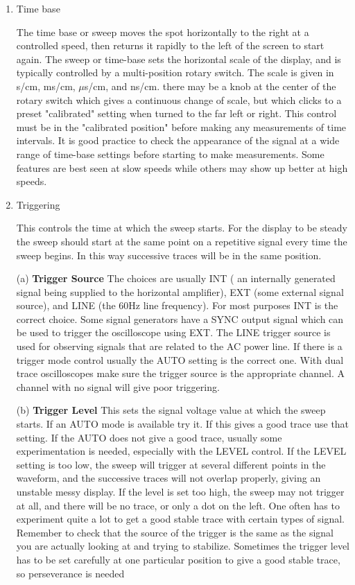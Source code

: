 \begin{enumerate}
\item Time base

The time base or sweep moves the spot horizontally to the right at a controlled speed, then returns it rapidly to the left of the screen to start again. The sweep or time-base sets the horizontal scale of the display, and is typically controlled by a multi-position rotary switch. The scale is given in s/cm, ms/cm, $\mu$s/cm, and ns/cm. there may be a knob at the center of the rotary switch which gives a continuous change of scale, but which clicks to a preset "calibrated" setting when turned to the far left or right. This control must be in the "calibrated position" before making any measurements of time intervals. It is good practice to check the appearance of the signal at a wide range of time-base settings before starting to make measurements. Some features are best seen at slow speeds while others may show up better at high speeds.

\item Triggering

This controls the time at which the sweep starts. For the display to be steady the sweep should start at the same point on a repetitive signal every time the sweep begins. In this way successive traces will be in the same position.

(a) {\bf Trigger Source} The choices are usually INT ( an internally generated signal being supplied to the horizontal amplifier), EXT (some external signal source), and LINE (the 60Hz line frequency). For most purposes INT is the correct choice. Some signal generators have a SYNC output signal which can be used to trigger the oscilloscope using EXT. The LINE trigger source is used for observing signals that are related to the AC power line. If there is a trigger mode control usually the AUTO setting is the correct one. With dual trace oscilloscopes make sure the trigger source is the appropriate channel. A channel with no signal will give poor triggering.

(b) {\bf Trigger Level} This sets the signal voltage value at which the sweep starts. If an AUTO mode is available try it. If this gives a good trace use that setting. If the AUTO does not give a good trace, usually some experimentation is needed, especially with the LEVEL control. If the LEVEL setting is too low, the sweep will trigger at several different points in the waveform, and the successive traces will not overlap properly, giving an unstable messy display. If the level is set too high, the sweep may not trigger at all, and there will be no trace, or only a dot on the left. One often has to experiment quite a lot to get a good stable trace with certain types of signal. Remember to check that the source of the trigger is the same as the signal you are actually looking at and trying to stabilize. Sometimes the trigger level has to be set carefully at one particular position to give a good stable trace, so perseverance is needed


\end{enumerate}
